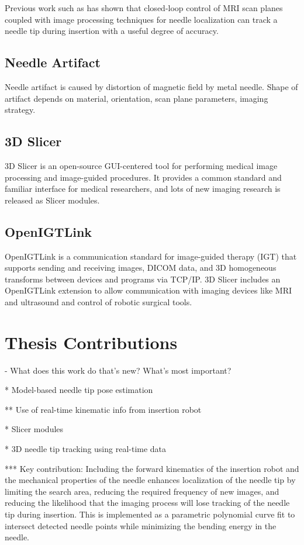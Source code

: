 Previous work such as \cite{AIMNeedleSteering} has shown that closed-loop control of MRI scan planes coupled with image processing techniques for needle localization can track a needle tip during insertion with a useful degree of accuracy.

\subsection{Needle Artifact}
Needle artifact is caused by distortion of magnetic field by metal needle. Shape of artifact depends on material, orientation, scan plane parameters, imaging strategy.

\subsection{3D Slicer}
3D Slicer\cite{Fedorov2012Slicer} is an open-source GUI-centered tool for performing medical image processing and image-guided procedures. It provides a common standard and familiar interface for medical researchers, and lots of new imaging research is released as Slicer modules.

\subsection{OpenIGTLink}
OpenIGTLink is a communication standard for image-guided therapy (IGT) that supports sending and receiving images, DICOM data, and 3D homogeneous transforms between devices and programs via TCP/IP. 3D Slicer includes an OpenIGTLink extension to allow communication with imaging devices like MRI and ultrasound and control of robotic surgical tools.

\section{Thesis Contributions}
- What does this work do that's new? What's most important?

* Model-based needle tip pose estimation

** Use of real-time kinematic info from insertion robot

* Slicer modules

* 3D needle tip tracking using real-time data

*** Key contribution: Including the forward kinematics of the insertion robot and the mechanical properties of the needle enhances localization of the needle tip by limiting the search area, reducing the required frequency of new images, and reducing the likelihood that the imaging process will lose tracking of the needle tip during insertion. This is implemented as a parametric polynomial curve fit to intersect detected needle points while minimizing the bending energy in the needle.



